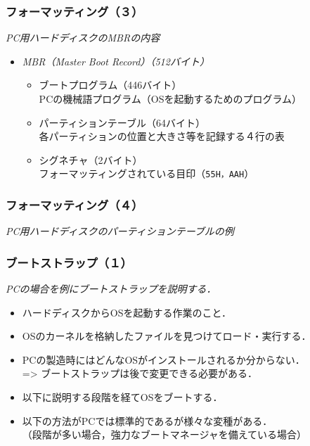 \documentclass[unicode]{beamer}                   %
\begin{document}
\begin{frame}
  \frametitle{フォーマッティング（３）}
  \emph{PC用ハードディスクのMBRの内容}
  \begin{itemize}
  \item \emph{MBR（Master Boot Record）（512バイト）} \\
    \begin{itemize}
    \item ブートプログラム（446バイト） \\
      PCの機械語プログラム（OSを起動するためのプログラム）
    \item パーティションテーブル（64バイト） \\
      各パーティションの位置と大きさ等を記録する４行の表 \\
    \item シグネチャ（2バイト） \\
      フォーマッティングされている目印（\texttt{55H，AAH}）
    \end{itemize}
  \end{itemize}
\end{frame}

\begin{frame}
  \frametitle{フォーマッティング（４）}
  \emph{PC用ハードディスクのパーティションテーブルの例}
  \begin{center}
    \begin{minipage}{0.64\columnwidth}
    \end{minipage}
    \begin{minipage}{0.34\columnwidth}
    \end{minipage}
  \end{center}
\end{frame}

\begin{frame}
  \frametitle{ブートストラップ（１）}
  \emph{PCの場合を例にブートストラップを説明する．}
  \begin{itemize}
  \item ハードディスクからOSを起動する作業のこと．
  \item OSのカーネルを格納したファイルを見つけてロード・実行する．
  \item PCの製造時にはどんなOSがインストールされるか分からない． \\
    => ブートストラップは後で変更できる必要がある．
  \item 以下に説明する段階を経てOSをブートする．
  \item 以下の方法がPCでは標準的であるが様々な変種がある．\\
    （段階が多い場合，強力なブートマネージャを備えている場合）
  \end{itemize}
\end{frame}
\end{document}
